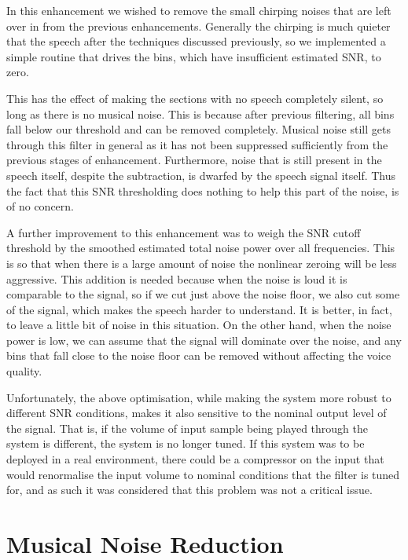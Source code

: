 \documentclass[11pt]{article} %
\begin{document}
{In this enhancement we wished to remove the small chirping noises that are left over in from the previous enhancements. Generally the chirping is much quieter that the speech after the techniques discussed previously, so we implemented a simple routine that drives the bins, which have insufficient estimated SNR, to zero.

This has the effect of making the sections with no speech completely silent, so long as there is no musical noise. This is because after previous filtering, all bins fall below our threshold and can be removed completely. Musical noise still gets through this filter in general as it has not been suppressed sufficiently from the previous stages of enhancement. Furthermore, noise that is still present in the speech itself, despite the subtraction, is dwarfed by the speech signal itself. Thus the fact that this SNR thresholding does nothing to help this part of the noise, is of no concern.

A further improvement to this enhancement was to weigh the SNR cutoff threshold by the smoothed estimated total noise power over all frequencies. This is so that  when there is a large amount of noise the nonlinear zeroing will be less aggressive.
This addition is needed because when the noise is loud it is comparable to the signal, so if we cut just above the noise floor, we also cut some of the signal, which makes the speech harder to understand. It is better, in fact, to leave a little bit of noise in this situation. On the other hand, when the noise power is low, we can assume that the signal will dominate over the noise, and any bins that fall close to the noise floor can be removed without affecting the voice quality.

Unfortunately, the above optimisation, while making the system more robust to different SNR conditions, makes it also sensitive to the nominal output level of the signal. That is, if the volume of input sample being played through the system is different, the system is no longer tuned. If this system was to be deployed in a real environment, there could be a compressor on the input that would renormalise the input volume to nominal conditions that the filter is tuned for, and as such it was considered that this problem was not a critical issue.

\section{Musical Noise Reduction} 
\label{sec:musicalNoise}

}
\end{document}

